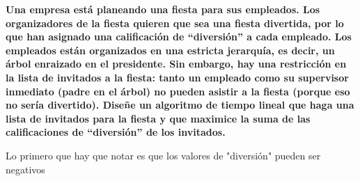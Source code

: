 \textbf{Una empresa est\'a planeando una fiesta para sus empleados. Los organizadores de la fiesta quieren que sea una fiesta divertida, por lo que han asignado una calificaci\'on de ``diversi\'on'' a cada empleado. Los empleados est\'an organizados en una estricta jerarqu\'ia, es decir, un \'arbol enraizado en el presidente. Sin embargo, hay una restricci\'on en la lista de invitados a la fiesta: tanto un empleado como su supervisor inmediato (padre en el \'arbol) no pueden asistir a la fiesta (porque eso no ser\'ia divertido). Dise\~ne un algoritmo de tiempo lineal que haga una lista de invitados para la fiesta y que maximice la suma de las calificaciones de ``diversi\'on'' de los invitados.}\vspace{.2cm}

Lo primero que hay que notar es que 
los valores de "diversión" pueden ser negativos


\textcolor{bibi}{}
\begin{quote}
\end{quote}

\newpage